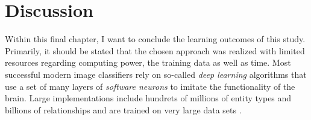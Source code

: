 \documentclass[twoside,11pt]{article}
\begin{document}
\section{Discussion}
	Within this final chapter, I want to conclude the learning outcomes of this study. Primarily, it should be stated that the chosen approach was realized with limited resources regarding computing power, the training data as well as time. Most successful modern image classifiers rely on so-called \textit{deep learning} algorithms that use a set of many layers of \textit{software neurons} to imitate the functionality of the brain. Large implementations include hundrets of millions of entity types and billions of relationships and are trained on very large data sets \citep{deepLearning}.

\end{document}
